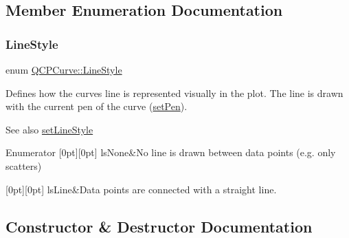\subsection{Member Enumeration Documentation}
\mbox{\label{class_q_c_p_curve_a2710e9f79302152cff794c6e16cc01f1}} 
\subsubsection{\texorpdfstring{Line\+Style}{LineStyle}}
{\footnotesize\ttfamily enum \mbox{\hyperlink{class_q_c_p_curve_a2710e9f79302152cff794c6e16cc01f1}{Q\+C\+P\+Curve\+::\+Line\+Style}}}

Defines how the curve\textquotesingle{}s line is represented visually in the plot. The line is drawn with the current pen of the curve (\mbox{\hyperlink{class_q_c_p_abstract_plottable_ab74b09ae4c0e7e13142fe4b5bf46cac7}{set\+Pen}}). \begin{DoxySeeAlso}{See also}
\mbox{\hyperlink{class_q_c_p_curve_a4a377ec863ff81a1875c3094a6177c19}{set\+Line\+Style}} 
\end{DoxySeeAlso}
\begin{DoxyEnumFields}{Enumerator}
[0pt][0pt]{}\mbox{\label{class_q_c_p_curve_a2710e9f79302152cff794c6e16cc01f1aec1601a191cdf0b4e761c4c66092cc48}} 
ls\+None&No line is drawn between data points (e.\+g. only scatters) \\
\hline

[0pt][0pt]{}\mbox{\label{class_q_c_p_curve_a2710e9f79302152cff794c6e16cc01f1ade5822ce6fbf131d3df131795c2e1003}} 
ls\+Line&Data points are connected with a straight line. \\
\hline

\end{DoxyEnumFields}


\subsection{Constructor \& Destructor Documentation}
\mbox{\label{class_q_c_p_curve_a36de58e2652b3fa47bdf9187d421d3ce}} 
